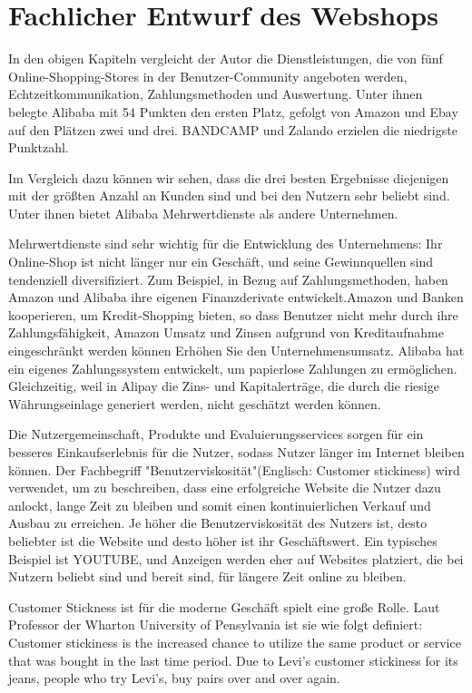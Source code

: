 
\chapter{Fachlicher Entwurf des Webshops}

In den obigen Kapiteln vergleicht der Autor die Dienstleistungen, die von fünf Online-Shopping-Stores in der Benutzer-Community angeboten werden, Echtzeitkommunikation, Zahlungsmethoden und Auswertung. Unter ihnen belegte Alibaba mit 54 Punkten den ersten Platz, gefolgt von Amazon und Ebay auf den Plätzen zwei und drei. BANDCAMP und Zalando erzielen die niedrigste Punktzahl.

Im Vergleich dazu können wir sehen, dass die drei besten Ergebnisse diejenigen mit der größten Anzahl an Kunden sind und bei den Nutzern sehr beliebt sind. Unter ihnen bietet Alibaba Mehrwertdienste als andere Unternehmen.

Mehrwertdienste sind sehr wichtig für die Entwicklung des Unternehmens: Ihr On\-line-Shop ist nicht länger nur ein Geschäft, und seine Gewinnquellen sind tendenziell diversifiziert. Zum Beispiel, in Bezug auf Zahlungsmethoden, haben Amazon und Alibaba ihre eigenen Finanzderivate entwickelt.Amazon und Banken kooperieren, um Kredit-Shopping bieten, so dass Benutzer nicht mehr durch ihre Zahlungsfähigkeit, Amazon Umsatz und Zinsen aufgrund von Kreditaufnahme eingeschränkt werden können Erhöhen Sie den Unternehmensumsatz. Alibaba hat ein eigenes Zahlungssystem entwickelt, um \glqq{}papierlose\grqq{} Zahlungen zu ermöglichen. Gleichzeitig, weil in Alipay die Zins- und Kapitalerträge, die durch die riesige Währungseinlage generiert werden, nicht geschätzt werden können.

Die Nutzergemeinschaft, Produkte und Evaluierungsservices sorgen für ein besseres Einkaufserlebnis für die Nutzer, sodass Nutzer länger im Internet bleiben können. Der Fachbegriff "Benutzerviskosität"(Englisch: Customer stickiness) wird verwendet, um zu beschreiben, dass eine erfolgreiche Website die Nutzer dazu anlockt, lange Zeit zu bleiben und somit einen kontinuierlichen Verkauf und Ausbau zu erreichen. Je höher die Benutzerviskosität des Nutzers ist, desto beliebter ist die Website und desto höher ist ihr Geschäftswert. Ein typisches Beispiel ist YOUTUBE, und Anzeigen werden eher auf Websites platziert, die bei Nutzern beliebt sind und bereit sind, für längere Zeit online zu bleiben.

Customer Stickness ist für die moderne Geschäft spielt eine große Rolle. Laut \textcite{bradlow-wharton} Professor der Wharton University of Pensylvania ist sie wie folgt definiert: \glqq{}Customer stickiness is the increased chance to utilize the same product or service that was bought in the last time period. Due to Levi’s customer stickiness for its jeans, people who try Levi’s, buy pairs over and over again.\grqq{}

